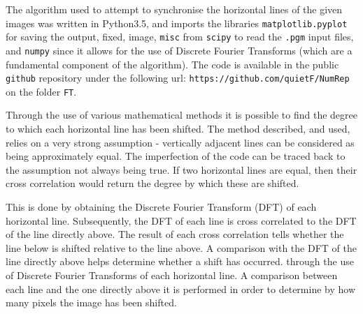 \documentclass[a4paper,10pt]{article}
\begin{document}
The algorithm used to attempt to synchronise the horizontal lines of the given images was written in Python3.5, and imports the libraries \texttt{matplotlib.pyplot} for saving the output, fixed, image, \texttt{misc} from \texttt{scipy} to read the \texttt{.pgm} input files, and \texttt{numpy} since it allows for the use of Discrete Fourier Transforms (which are a fundamental component of the algorithm). The code is available in the public \texttt{github} repository under the following url: \texttt{https://github.com/quietF/NumRep} on the folder \texttt{FT}.

Through the use of various mathematical methods it is possible to find the degree to which each horizontal line has been shifted. The method described, and used, relies on a very strong assumption - vertically adjacent lines can be considered as being approximately equal. The imperfection of the code can be traced back to the assumption not always being true. If two horizontal lines are equal, then their cross correlation would return the degree by which these are shifted. 

This is done by obtaining the Discrete Fourier Transform (DFT) of each horizontal line. Subsequently, the DFT of each line is cross correlated to the DFT of the line directly above. The result of each cross correlation tells whether the line below is shifted relative to the line above.  A comparison with the DFT of the line directly above helps determine whether a shift has occurred.  through the use of Discrete Fourier Transforms of each horizontal line. A comparison between each line and the one directly above it is performed in order to determine by how many pixels the image has been shifted. 




\end{document}
